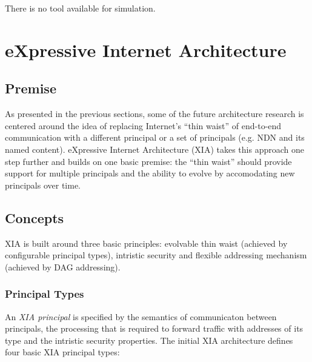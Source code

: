             There is no tool available for simulation.

    \section{eXpressive Internet Architecture}\label{archs:xia}

        \subsection{Premise}

            As presented in the previous sections, some of the future architecture research is centered around the idea of replacing Internet's ``thin waist'' of end-to-end communication with a different principal or a set of principals (e.g. NDN and its named content). eXpressive Internet Architecture (XIA) takes this approach one step further and builds on one basic premise: the ``thin waist'' should provide support for multiple principals and the ability to evolve by accomodating new principals over time.

        \subsection{Concepts}

            XIA is built around three basic principles: evolvable thin waist (achieved by configurable principal types), intristic security and flexible addressing mechanism (achieved by DAG addressing).

            \subsubsection{Principal Types}

                An \emph{XIA principal} is specified by the semantics of communicaton between principals, the processing that is required to forward traffic with addresses of its type and the intristic security properties. The initial XIA architecture defines four basic XIA principal types:

